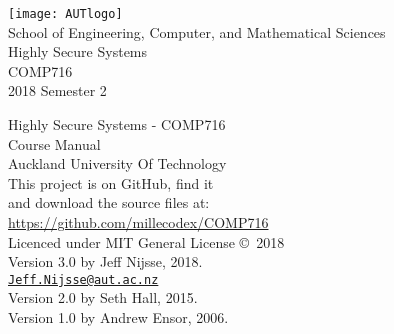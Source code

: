 \documentclass[a4paper,oneside]{book}
\begin{document}
 \frontmatter
 \begin{titlepage}
 	\begin{center}
 		
 		\texttt{[image: AUTlogo]}\\
 		{\vspace{2cm}}
 		{\Large School of Engineering, Computer, and Mathematical Sciences}
 		\vspace{3cm}\\
 		{\huge Highly Secure Systems}\\
 		\vspace{1cm}
 		{\huge COMP716} \\
 		\vspace{1cm}
 		{\huge 2018 Semester 2} \\
 		\vfill
 	\end{center}
 \end{titlepage}
 
 \clearpage\thispagestyle{empty}
   \vspace*{\fill}
 Highly Secure Systems - COMP716\\
 Course Manual\\
 Auckland University Of Technology\\
 
 This project is on GitHub, find it \\
 and download the source files at: \\
 \url{https://github.com/millecodex/COMP716} \\                            
                                                                      
 Licenced under MIT General License \copyright\, 2018 \\     
 
 Version 3.0 by Jeff Nijsse, 2018.\\
\href{mailto:Jeff.Nijsse@aut.ac.nz}{\texttt{Jeff.Nijsse@aut.ac.nz}}\\
 Version 2.0 by Seth Hall, 2015.\\
 Version 1.0 by Andrew Ensor, 2006.
 
 
    
    
    \tableofcontents

  \mainmatter
    
    
    
    
    
	

  \appendix
\end{document}
